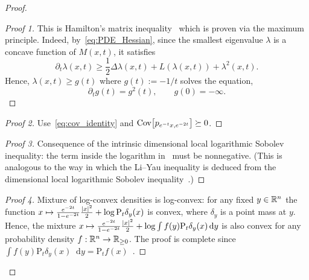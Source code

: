 \documentclass[AHL,Unicode,longabstracts]{cedram}
\newcommand{\R}{\mathbb R}
\DeclareMathOperator{\Cov}{Cov}
\newcommand{\Pheat}{\mathrm{P}}
\newcommand{\dd}{n}
\newcommand{\density}{f}
\newcommand*\diff{\mathop{}\!\mathrm{d}}
\renewcommand*{\to}{\mathchoice{\longrightarrow}{\rightarrow}{\rightarrow}{\rightarrow}}
\let\oldmapsto\mapsto
\renewcommand*{\mapsto}{\mathchoice{\longmapsto}{\oldmapsto}{\oldmapsto}{\oldmapsto}}
\let\originalleft\left
\let\originalright\right
\renewcommand{\left}{\mathopen{}\mathclose\bgroup\originalleft}
\renewcommand{\right}{\aftergroup\egroup\originalright}
\let\oldin\in
\renewcommand{\in}{\mathchoice{\oldin}{\oldin}{\,\oldin\,}{\,\oldin\,}}
\newcommand*{\MK}{\mkern 2mu}
\begin{document}
\begin{proof}
\begin{proofc}[{Proofs of Proposition~\ref{prop:OU_smooth_appendix}$\MK$\eqref{propA.2.1}}]
\begin{proof}[{Proof 1}]
This is Hamilton's matrix inequality~\cite{MR4370325} which is proven via the maximum principle. Indeed, by~\eqref{eq:PDE_Hessian}, since the smallest eigenvalue \(\lambda\) is a concave function of \(M(x,t)\), it satisfies
\begin{equation}\label{eq:min_eigenvalue}
\partial_{t}\lambda(x,t)\ge \frac{1}{2}\Delta \lambda (x,t) +L(\lambda (x,t))+ \lambda^{2}(x,t).
\end{equation}
Hence, $\lambda(x,t)\ge g(t)$ where \(g(t):=-1/t\) solves the equation,
\[
\partial_tg(t)=g^{2}(t), \qquad g(0)=-\infty.
\]
\let\qed\relax
\end{proof}
\begin{proof}[{Proof 2}] Use~\eqref{eq:cov_identity} and $\Cov\left[p_{e^{-t}x,e^{-2t}}\right]\succeq 0$.
\let\qed\relax
\end{proof}
\begin{proof}[{Proof 3}]
Consequence of the intrinsic dimensional local logarithmic Sobolev inequality: the term inside the logarithm in~\cite[Eq.~29]{MR4698563} must be nonnegative. (This is analogous to the way in which the Li--Yau inequality is deduced from the dimensional local logarithmic Sobolev inequality~\cite{MR3612336}.)
\let\qed\relax
\end{proof}

\begin{proof}[{Proof 4}]
Mixture of log-convex densities is log-convex: for any fixed $y\in \R^{\dd}$ the function $x\mapsto \frac{e^{-2t}}{1-e^{-2t}}\frac{|x|^2}{2}+\log \Pheat_t\delta_y(x)$ is convex, where $\delta_y$ is a point mass at $y$. Hence, the mixture $x\mapsto\frac{e^{-2t}}{1-e^{-2t}}\frac{|x|^2}{2}+\log \int\density(y)\Pheat_t\delta_y(x)\diff y$ is also convex for any probability density $\density:\R^{\dd}\to \R_{\ge 0}$. The proof is complete since $ \int\density(y)\Pheat_t\delta_y(x)\diff y=\Pheat_t\density(x)$~\cite[Lemma~1.3, Appendix]{MR3782065}.\qedhere
\end{proof}\let\qed\relax
\end{proofc}


\end{proof}
\end{document}
